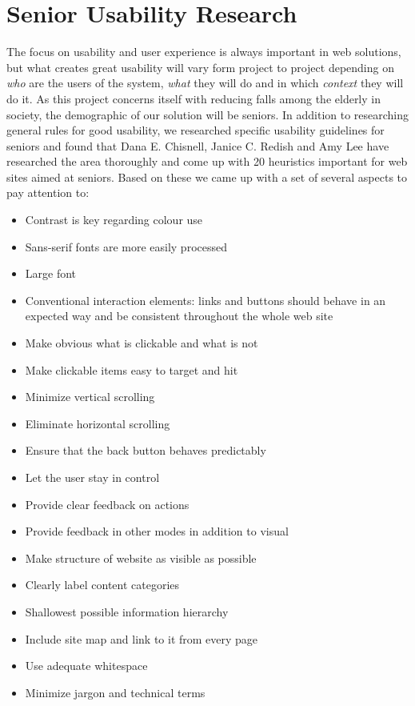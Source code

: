 \section{Senior Usability Research}
The focus on usability and user experience is always important in web solutions, but what creates great usability will vary form project to project depending on \textit{who} are the users of the system, \textit{what} they will do and in which \textit{context} they will do it. As this project concerns itself with reducing falls among the elderly in society, the demographic of our solution will be seniors. In addition to researching general rules for good usability, we researched specific usability guidelines for seniors and found that Dana E. Chisnell, Janice C. Redish and Amy Lee \cite{heuristics} have researched the area thoroughly and come up with 20 heuristics important for web sites aimed at seniors. Based on these we came up with a set of several aspects to pay attention to: 
\begin{itemize}
  \item Contrast is key regarding colour use
  \item Sans-serif fonts are more easily processed
  \item Large font
  \item Conventional interaction elements: links and buttons should behave in an expected way and be consistent throughout the whole web site
  \item Make obvious what is clickable and what is not
  \item Make clickable items easy to target and hit
  \item Minimize vertical scrolling
  \item Eliminate horizontal scrolling
  \item Ensure that the back button behaves predictably
  \item Let the user stay in control
  \item Provide clear feedback on actions
  \item Provide feedback in other modes in addition to visual
  \item Make structure of website as visible as possible
  \item Clearly label content categories
  \item Shallowest possible information hierarchy
  \item Include site map and link to it from every page
  \item Use adequate whitespace
  \item Minimize jargon and technical terms
  
\end{itemize}
